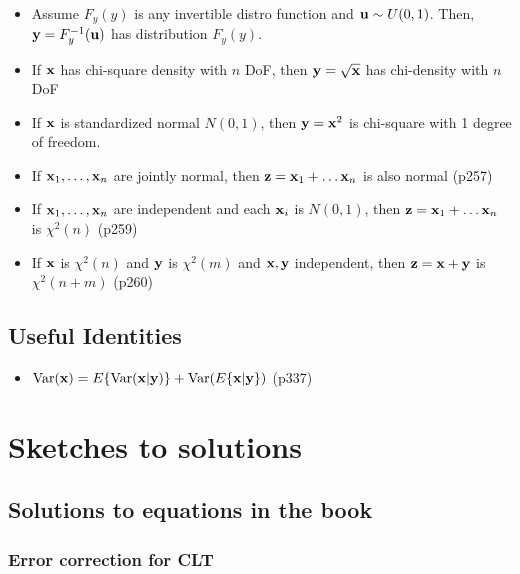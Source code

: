 \documentclass[a4paper, oneside]{book}
\begin{document}
\begin{itemize}
\item Assume $F_y(y)$ is any invertible distro function and $\mathbf u \sim U(0,1)$. Then, $\mathbf y = F_y^{-1} (\mathbf u)$ has distribution $F_y(y)$.
\item If $\mathbf x$ has chi-square density with $n$ DoF, then $\mathbf y = \sqrt{\mathbf x}$ has chi-density with $n$ DoF
\item If $\mathbf x$ is standardized normal $N(0,1)$, then $\mathbf y= \mathbf x^2$ is chi-square with 1 degree of freedom.
\item If $\mathbf{x}_1, \hdots, \mathbf{x}_n$ are jointly normal, then $\mathbf{z} = \mathbf{x}_1 + \hdots \mathbf{x}_n$ is also normal (p257)
\item If $\mathbf{x}_1, \hdots, \mathbf{x}_n$ are independent and each $\mathbf{x}_i$ is $N(0,1)$, then $\mathbf{z} = \mathbf{x}_1 + \hdots \mathbf{x}_n$ is $\chi^2(n)$ (p259)
\item If $\mathbf{x}$ is $\chi^2(n)$ and $\mathbf{y}$ is $\chi^2(m)$ and $\mathbf{x,y}$ independent, then $\mathbf{z} = \mathbf{x+y}$ is $\chi^2(n+m)$ (p260)
\end{itemize}

\section{Useful Identities}
\begin{itemize}
\item $\text{Var}(\mathbf{x}) = E\{\text{Var}(\mathbf{x|y})\} + \text{Var}(E\{\mathbf{x|y}\})$ (p337)
\end{itemize}
























\chapter*{Sketches to solutions}
\section{Solutions to equations in the book}

\subsection{Error correction for CLT}
\label{sec:error_correction}
\end{document}

